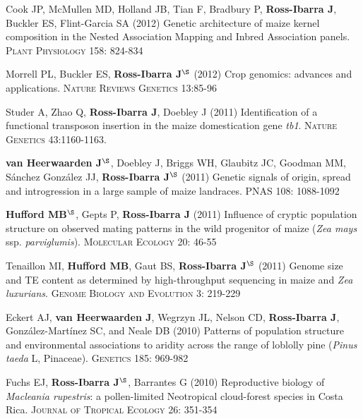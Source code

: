 \documentclass[letterpaper,10pt]{article}
\begin{document}
\begin{etaremune}
\item Cook JP, McMullen MD, Holland JB, Tian F, Bradbury P, {\bf Ross-Ibarra J}, Buckler ES, Flint-Garcia SA (2012) Genetic architecture of maize kernel composition in the Nested Association Mapping and Inbred Association panels. \textsc{Plant Physiology} 158: 824-834

\item Morrell PL, Buckler ES, {\bf Ross-Ibarra J}$^\S$ (2012) Crop genomics: advances and applications.  \textsc{Nature Reviews Genetics} 13:85-96 %


\item Studer A, Zhao Q, {\bf Ross-Ibarra J}, Doebley J (2011) Identification of a functional transposon insertion in the maize domestication gene \emph{tb1}.  \textsc{Nature Genetics} 43:1160-1163.


\item {\bf van Heerwaarden J}$^\S$, Doebley J, Briggs WH, Glaubitz JC, Goodman MM, S\'{a}nchez Gonz\'{a}lez JJ, {\bf Ross-Ibarra J}$^\S$ (2011) Genetic signals of origin, spread and introgression in a large sample of maize landraces. PNAS 108: 1088-1092


\item {\bf Hufford MB}$^\S$, Gepts P, {\bf Ross-Ibarra J} (2011) Influence of cryptic population structure on observed mating patterns in the wild progenitor of maize (\emph{Zea mays} ssp. \emph{parviglumis}).  \textsc{Molecular Ecology} 20: 46-55


\item Tenaillon MI, {\bf Hufford MB}, Gaut BS, {\bf Ross-Ibarra J}$^\S$ (2011)  Genome size and TE content as determined by high-throughput sequencing in maize and \emph{Zea luxurians}.  \textsc{Genome Biology and Evolution } 3: 219-229


\item Eckert AJ, {\bf van Heerwaarden J}, Wegrzyn JL, Nelson CD, {\bf Ross-Ibarra J}, Gonz\'{a}lez-Mart\'{i}nez SC, and Neale DB (2010) Patterns of population structure and environmental associations to aridity across the range of loblolly pine (\emph{Pinus taeda} L, Pinaceae).  \textsc{Genetics} 185: 969-982


\item Fuchs EJ, {\bf Ross-Ibarra J}$^\S$, Barrantes G (2010) Reproductive biology of \emph{Macleania rupestris}: a pollen-limited Neotropical cloud-forest species in Costa Rica.  \textsc{Journal of Tropical Ecology} 26: 351-354



\end{etaremune}
\end{document}
